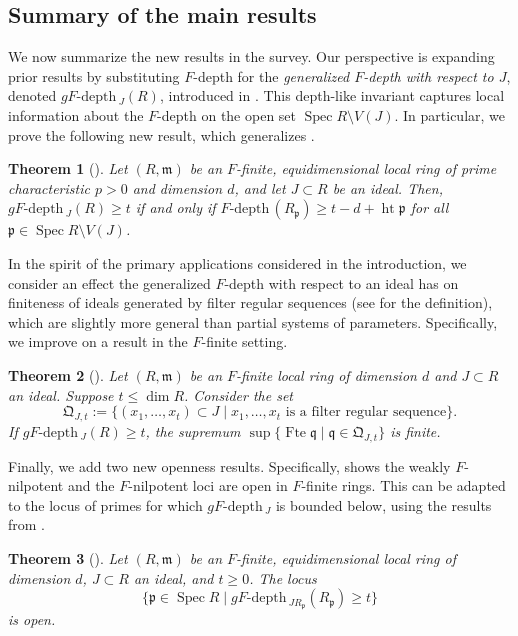 \documentclass{amsproc}
\newtheorem{theorem}{Theorem}[section]
\theoremstyle{definition}
\theoremstyle{remark}
\numberwithin{equation}{section}
\newcommand{\fm}{\mathfrak{m}}
\newcommand{\fp}{\mathfrak{p}}
\newcommand{\fq}{\mathfrak{q}}
\newcommand{\Spec}{\operatorname{Spec}}
\newcommand{\hgt}{\operatorname{ht}}
\newcommand{\fte}{\operatorname{Fte}}
\newcommand{\fdp}{F\text{-depth}\,}
\newcommand{\gfdp}{gF\text{-depth}\,}
\newcommand{\fQ}{\mathfrak{Q}}
\begin{document}
\subsection{Summary of the main results}  We now summarize the new results in the survey. Our perspective is expanding prior results by substituting $F$-depth for the \textit{generalized $F$-depth with respect to $J$}, denoted $\gfdp_J(R)$,  introduced in \cite{CMM23}. This depth-like invariant captures local information about the $F$-depth on the open set $\Spec R \setminus V(J)$. In particular, we prove the following new result, which generalizes \cite[Prop. 4.6]{KMPS23}. 

\begin{theorem}[]
    Let $(R,\fm)$ be an $F$-finite, equidimensional local ring of prime characteristic $p>0$ and dimension $d$, and let $J\subset R$ be an ideal. Then, $\gfdp_J(R) \ge t$ if and only if $\fdp(R_\fp) \ge t-d+\hgt \fp$ for all $\fp \in \Spec R \setminus V(J)$.
\end{theorem} 


In the spirit of the primary applications considered in the introduction, we consider an effect the generalized $F$-depth with respect to an ideal has on finiteness of ideals generated by filter regular sequences (see  for the definition), which are slightly more general than partial systems of parameters. Specifically, we improve on a result \cite[Thm. 1.1]{HQ22} in the $F$-finite setting. 


\begin{theorem}[] Let $(R,\fm)$ be an $F$-finite local ring of dimension $d$ and $J \subset R$ an ideal. Suppose $t \leq \dim R$. Consider the set $$\fQ_{J,t} := \{ (x_1,\ldots,x_t) \subset J \mid x_1,\ldots,x_t \textrm{ is a filter regular sequence} \}.$$ If $\gfdp_J(R) \geq t$, the supremum $\sup\{\fte \fq \mid \fq \in \fQ_{J,t}\}$ is finite. \end{theorem}

Finally, we add two new openness results. Specifically, \cite[Thm. 5.2]{KMPS23} shows the weakly $F$-nilpotent and the $F$-nilpotent loci are open in $F$-finite rings. This can be adapted to the locus of primes for which $\gfdp_J$ is bounded below, using the results from \cite{CMM23}.

\begin{theorem}[]
    Let $(R,\fm)$ be an $F$-finite, equidimensional local ring of dimension $d$, $J\subset R$ an ideal, and $t \ge 0$. The locus \[\{\fp \in \Spec R \mid \gfdp_{JR_\fp}(R_\fp) \ge t \}\] is open.
\end{theorem}
\end{document}
